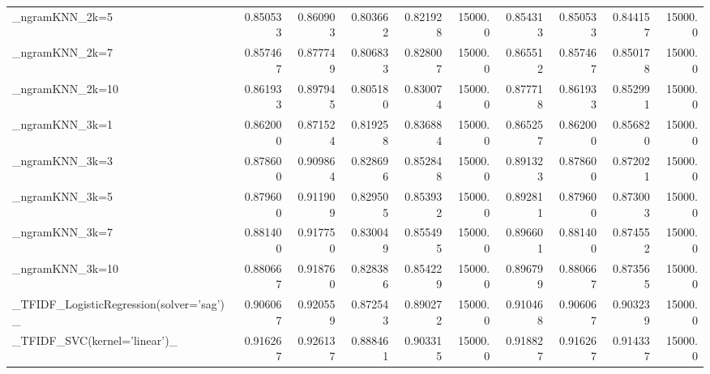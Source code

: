 \begin{tabular}{lrrrrrrrrr}
\_ngramKNN\_2k=5                                     &  0.850533 &         0.860903 &      0.803662 &        0.821928 &        15000.0 &            0.854313 &         0.850533 &           0.844157 &           15000.0 \\
\_ngramKNN\_2k=7                                     &  0.857467 &         0.877749 &      0.806833 &        0.828007 &        15000.0 &            0.865512 &         0.857467 &           0.850178 &           15000.0 \\
\_ngramKNN\_2k=10                                    &  0.861933 &         0.897945 &      0.805180 &        0.830074 &        15000.0 &            0.877718 &         0.861933 &           0.852991 &           15000.0 \\
\_ngramKNN\_3k=1                                     &  0.862000 &         0.871524 &      0.819258 &        0.836884 &        15000.0 &            0.865257 &         0.862000 &           0.856820 &           15000.0 \\
\_ngramKNN\_3k=3                                     &  0.878600 &         0.909864 &      0.828696 &        0.852848 &        15000.0 &            0.891323 &         0.878600 &           0.872021 &           15000.0 \\
\_ngramKNN\_3k=5                                     &  0.879600 &         0.911909 &      0.829505 &        0.853932 &        15000.0 &            0.892811 &         0.879600 &           0.873003 &           15000.0 \\
\_ngramKNN\_3k=7                                     &  0.881400 &         0.917750 &      0.830049 &        0.855495 &        15000.0 &            0.896601 &         0.881400 &           0.874552 &           15000.0 \\
\_ngramKNN\_3k=10                                    &  0.880667 &         0.918760 &      0.828386 &        0.854229 &        15000.0 &            0.896799 &         0.880667 &           0.873565 &           15000.0 \\
\_TFIDF\_LogisticRegression(solver='sag')\_           &  0.906067 &         0.920559 &      0.872543 &        0.890272 &        15000.0 &            0.910468 &         0.906067 &           0.903239 &           15000.0 \\
\_TFIDF\_SVC(kernel='linear')\_                       &  0.916267 &         0.926137 &      0.888461 &        0.903315 &        15000.0 &            0.918827 &         0.916267 &           0.914337 &           15000.0 \\

\end{tabular}
